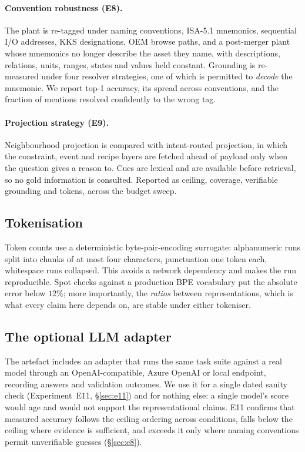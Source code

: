 \paragraph{Convention robustness (E8).} The plant is re-tagged under
\NSchemes{} naming conventions, ISA-5.1 mnemonics, sequential I/O addresses,
KKS designations, OEM browse paths, and a post-merger plant whose mnemonics no
longer describe the asset they name, with descriptions, relations, units,
ranges, states and values held constant. Grounding is re-measured under four
resolver strategies, one of which is permitted to \emph{decode} the mnemonic.
We report top-1 accuracy, its spread across conventions, and the fraction of
mentions resolved confidently to the wrong tag.

\paragraph{Projection strategy (E9).} Neighbourhood projection is compared with
intent-routed projection, in which the constraint, event and recipe layers are
fetched ahead of payload only when the question gives a reason to. Cues are
lexical and are available before retrieval, so no gold information is consulted.
Reported as ceiling, coverage, verifiable grounding and tokens, across the
budget sweep.

\subsection{Tokenisation}

Token counts use a deterministic byte-pair-encoding surrogate: alphanumeric runs
split into chunks of at most four characters, punctuation one token each,
whitespace runs collapsed. This avoids a network dependency and makes the run
reproducible. Spot checks against a production BPE vocabulary put the absolute
error below $12\%$; more importantly, the \emph{ratios} between representations,
which is what every claim here depends on, are stable under either
tokeniser.

\subsection{The optional LLM adapter}
\label{sec:llm-adapter}

The artefact includes an adapter that runs the same task suite against a real
model through an OpenAI-compatible, Azure OpenAI or local endpoint, recording
answers and validation outcomes. We use it for a single dated sanity check
(Experiment~E11, \S\ref{sec:e11}) and for nothing else: a single model's score
would age and would not support the representational claims. E11 confirms that
measured accuracy follows the ceiling ordering across conditions, falls below the
ceiling where evidence is sufficient, and exceeds it only where naming conventions
permit unverifiable guesses (\S\ref{sec:e8}).

